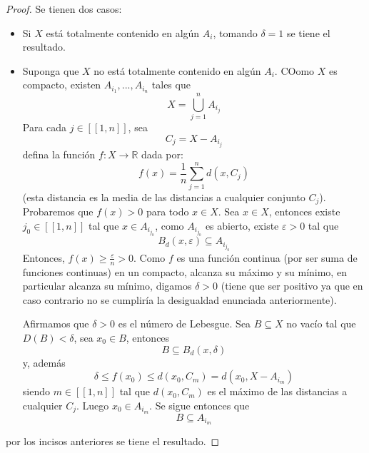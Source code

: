 \documentclass{article}
\theoremstyle{largebreak}
\newcommand\cf[3]{\ensuremath{#1:#2\rightarrow#3}}
\newcommand\natint[1]{\ensuremath{\left[\!\left[ #1\right]\!\right]}}
\begin{document}
    \begin{proof}
        Se tienen dos casos:
        \begin{itemize}
            \item Si $X$ está totalmente contenido en algún $A_i$, tomando $\delta=1$ se tiene el resultado.
            \item Suponga que $X$ no está totalmente contenido en algún $A_i$. COomo $X$ es compacto, existen $A_{ i_1},...,A_{ i_n}$ tales que
            \begin{equation*}
                X=\bigcup_{ j=1}^n A_{ i_j}
            \end{equation*}
            Para cada $j\in\natint{1,n}$, sea
            \begin{equation*}
                C_j=X-A_{ i_j}
            \end{equation*}
            defina la función $\cf{f}{X}{\mathbb{R}}$ dada por:
            \begin{equation*}
                f(x)=\frac{1}{n}\sum_{ j=1}^n d(x,C_j)
            \end{equation*}
            (esta distancia es la media de las distancias a cualquier conjunto $C_j$). Probaremos que $f(x)>0$ para todo $x\in X$. Sea $x\in X$, entonces existe $j_0\in\natint{1,n}$ tal que $x\in A_{ i_{ j_0}}$, como $A_{ i_{ j_0}}$ es abierto, existe $\varepsilon>0$ tal que
            \begin{equation*}
                B_d(x,\varepsilon)\subseteq A_{ i_{ j_0}}
            \end{equation*}
            Entonces, $f(x)\geq\frac{\varepsilon}{n}>0$. Como $f$ es una función continua (por ser suma de funciones continuas) en un compacto, alcanza su máximo y su mínimo, en particular alcanza su mínimo, digamos $\delta>0$ (tiene que ser positivo ya que en caso contrario no se cumpliría la desigualdad enunciada anteriormente).

            Afirmamos que $\delta>0$ es el número de Lebesgue. Sea $B\subseteq X$ no vacío tal que $D(B)<\delta$, sea $x_0\in B$, entonces
            \begin{equation*}
                B\subseteq B_d(x,\delta)
            \end{equation*}
            y, además
            \begin{equation*}
                \delta\leq f(x_0)\leq d(x_0,C_m)=d(x_0,X-A_{ i_m})
            \end{equation*}
            siendo $m\in\natint{1,n}$ tal que $d(x_0,C_m)$ es el máximo de las distancias a cualquier $C_j$. Luego $x_0\in A_{ i_m}$. Se sigue entonces que
            \begin{equation*}
                B\subseteq A_{ i_m}
            \end{equation*}
        \end{itemize}
        por los incisos anteriores se tiene el resultado.
    \end{proof}
\end{document}
